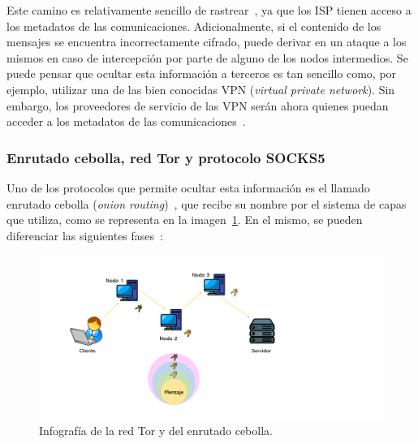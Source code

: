 Este camino es relativamente sencillo de rastrear~\cite{TorAndrea2022}, ya que los ISP tienen acceso a los metadatos de las comunicaciones. Adicionalmente, si el contenido de los mensajes se encuentra incorrectamente cifrado, puede derivar en un ataque a los mismos en caso de intercepción por parte de alguno de los nodos intermedios. Se puede pensar que ocultar esta información a terceros es tan sencillo como, por ejemplo, utilizar una de las bien conocidas VPN (\textit{virtual private network}). Sin embargo, los proveedores de servicio de las VPN serán ahora quienes puedan acceder a los metadatos de las comunicaciones~\cite{TorKeepCoding2022}.


\subsubsection{Enrutado cebolla, red Tor y protocolo SOCKS5}

Uno de los protocolos que permite ocultar esta información es el llamado enrutado cebolla (\textit{onion routing})~\cite{TorAvast2022}, que recibe su nombre por el sistema de capas que utiliza, como se representa en la imagen~\ref{img:red_tor}. En el mismo, se pueden diferenciar las siguientes fases~\cite{TorKeepCoding2022}: 

\begin{figure}[h]
	\caption[Enrutado cebolla.]{Infografía de la red Tor y del enrutado cebolla.}
	\label{img:red_tor}
	\centering
	\includegraphics[scale=0.45]{../img/memoria/3_onion_routing}
\end{figure}

